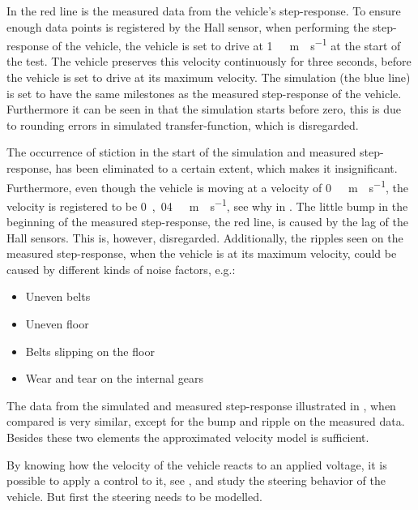 %
In  the red line is the measured data from the vehicle's step-response. To ensure enough data points is registered by the Hall sensor, when performing the step-response of the vehicle, the vehicle is set to drive at \si{1\ m\cdot s^{-1}} at the start of the test. The vehicle preserves this velocity continuously for three seconds, before the vehicle is set to drive at its maximum velocity. The simulation (the blue line) is set to have the same milestones as the measured step-response of the vehicle. Furthermore it can be seen in  that the simulation starts before zero, this is due to rounding errors in simulated transfer-function, which is disregarded.

The occurrence of stiction in the start of the simulation and measured step-response, has been eliminated to a certain extent, which makes it insignificant. Furthermore, even though the vehicle is moving at a velocity of \si{0\ m \cdot s^{-1}}, the velocity is registered to be \si{0,04\ m \cdot s^{-1}}, see why in . 
\newpage
The little bump in the beginning of the measured step-response, the red line, is caused by the lag of the Hall sensors. This is, however, disregarded. Additionally, the ripples seen on the measured step-response, when the vehicle is at its maximum velocity, could be caused by different kinds of noise factors, e.g.:

\begin{itemize}
\item Uneven belts
\item Uneven floor
\item Belts slipping on the floor
\item Wear and tear on the internal gears
\end{itemize}

The data from the simulated and measured step-response illustrated in , when compared is very similar, except for the bump and ripple on the measured data. Besides these two elements the approximated velocity model is sufficient.

By knowing how the velocity of the vehicle reacts to an applied voltage, it is possible to apply a control to it, see , and study the steering behavior of the vehicle. But first the steering needs to be modelled.